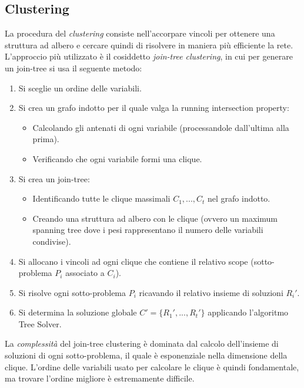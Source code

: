 \documentclass[11pt,oneside]{book}
\begin{document}
\subsection{Clustering}
La procedura del \textit{clustering} consiste nell'accorpare vincoli per ottenere una struttura ad albero e cercare quindi di risolvere in maniera più efficiente la rete. L'approccio più utilizzato è il cosiddetto \textit{join-tree clustering}, in cui per generare un join-tree si usa il seguente metodo:
\begin{enumerate}
	\item Si sceglie un ordine delle variabili.
	\item Si crea un grafo indotto per il quale valga la running intersection property:
	\begin{itemize}
	    \item Calcolando gli antenati di ogni variabile (processandole dall'ultima alla prima).
	    \item Verificando che ogni variabile formi una clique.
	\end{itemize}
	\newpage
	\item Si crea un join-tree:
	\begin{itemize}
		\item Identificando tutte le clique massimali $C_1, ..., C_t$ nel grafo indotto.
		\item Creando una struttura ad albero con le clique (ovvero un maximum spanning tree dove i pesi rappresentano il numero delle variabili condivise).
	\end{itemize}
	\item Si allocano i vincoli ad ogni clique che contiene il relativo scope (sotto-problema $P_i$ associato a $C_i$).
	\item Si risolve ogni sotto-problema $P_i$ ricavando il relativo insieme di soluzioni $R_i'$.
	\item Si determina la soluzione globale $C' = \{ R_1', ..., R_t' \} $ applicando l'algoritmo Tree Solver.
\end{enumerate}
La \textit{complessità} del join-tree clustering è dominata dal calcolo dell'insieme di soluzioni di ogni sotto-problema, il quale è esponenziale nella dimensione della clique. L'ordine delle variabili usato per calcolare le clique è quindi fondamentale, ma trovare l'ordine migliore è estremamente difficile.
\end{document}
